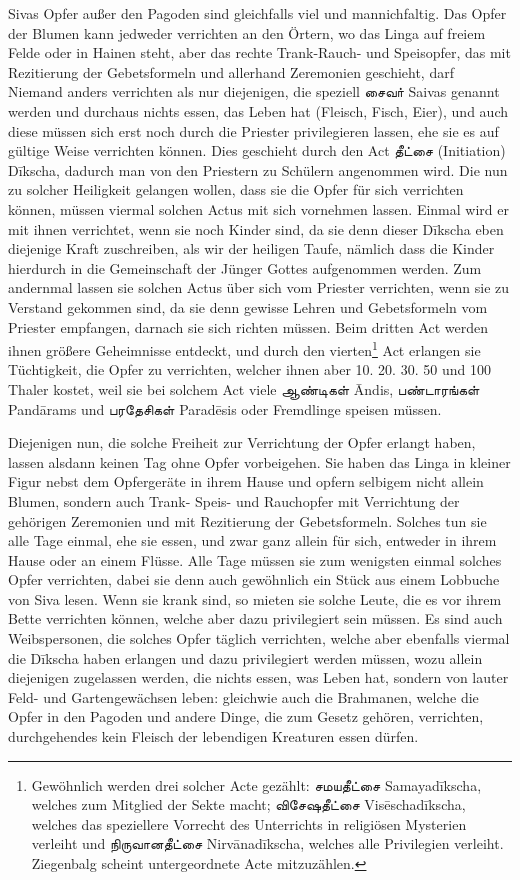 \documentclass{article}
\newcommand{\TamilText}[1]{\texttamil{#1}}
\newcommand{\tam}[1]{\TamilText{#1}}
\begin{document}
Sivas Opfer außer den Pagoden sind gleichfalls viel und mannichfaltig. Das Opfer der Blumen kann jedweder verrichten an den Örtern, wo das Linga auf freiem Felde oder in Hainen steht, aber das rechte Trank-Rauch- und Speisopfer, das mit Rezitierung der Gebetsformeln und allerhand Zeremonien geschieht, darf Niemand anders verrichten als nur diejenigen, die speziell \tam{சைவா்} Saivas genannt werden und durchaus nichts essen, das Leben hat (Fleisch, Fisch, Eier), und auch diese müssen sich erst noch durch die Priester privilegieren lassen, ehe sie es auf gültige Weise verrichten können. Dies geschieht durch den Act \tam{தீட்சை} (Initiation) D\={i}kscha, dadurch man von den Priestern zu Schülern angenommen wird. Die nun zu solcher Heiligkeit gelangen wollen, dass sie die Opfer für sich verrichten können, müssen viermal solchen Actus mit sich vornehmen lassen. Einmal wird er mit ihnen verrichtet, wenn sie noch Kinder sind, da sie denn dieser D\={i}kscha eben diejenige Kraft zuschreiben, als wir der heiligen Taufe, nämlich dass die Kinder hierdurch in die Gemeinschaft der Jünger Gottes aufgenommen werden. Zum andernmal lassen sie solchen Actus über sich vom Priester verrichten, wenn sie zu Verstand gekommen sind, da sie denn gewisse Lehren und Gebetsformeln vom Priester empfangen, darnach sie sich richten müssen. Beim dritten Act werden ihnen größere Geheimnisse entdeckt, und durch den vierten\footnote{Gewöhnlich werden drei solcher Acte gezählt: \tam{சமயதீட்சை} Samayad\={i}kscha, welches zum Mitglied der Sekte macht; \tam{விசேஷதீட்சை} Vis\={e}schad\={i}kscha, welches das speziellere Vorrecht des Unterrichts in religiösen Mysterien verleiht und \tam{நிருவானதீட்சை} Nirv\={a}nad\={i}kscha, welches alle Privilegien verleiht. Ziegenbalg scheint untergeordnete Acte mitzuzählen.} Act erlangen sie Tüchtigkeit, die Opfer zu verrichten, welcher ihnen aber 10. 20. 30. 50 und 100 Thaler kostet, weil sie bei solchem Act viele \tam{ஆண்டிகள்} \={A}ndis, \tam{பண்டாரங்கள்} Pand\={a}rams und \tam{பரதேசிகள்} Parad\={e}sis oder Fremdlinge speisen müssen.

Diejenigen nun, die solche Freiheit zur Verrichtung der Opfer erlangt haben, lassen alsdann keinen Tag ohne Opfer vorbeigehen. Sie haben das Linga in kleiner Figur nebst dem Opfergeräte in ihrem Hause und opfern selbigem nicht allein Blumen, sondern auch Trank- Speis- und Rauchopfer mit Verrichtung der gehörigen Zeremonien und mit Rezitierung der Gebetsformeln. Solches tun sie alle Tage einmal, ehe sie essen, und zwar ganz allein für sich, entweder in ihrem Hause oder an einem Flüsse. Alle Tage müssen sie zum wenigsten einmal solches Opfer verrichten, dabei sie denn auch gewöhnlich ein Stück aus einem Lobbuche von Siva lesen. Wenn sie krank sind, so mieten sie solche Leute, die es vor ihrem Bette verrichten können, welche aber dazu privilegiert sein müssen. Es sind auch Weibspersonen, die solches Opfer täglich verrichten, welche aber ebenfalls viermal die D\={i}kscha haben erlangen und dazu privilegiert werden müssen, wozu allein diejenigen zugelassen werden, die nichts essen, was Leben hat, sondern von lauter Feld- und Gartengewächsen leben: gleichwie auch die Brahmanen, welche die Opfer in den Pagoden und andere Dinge, die zum Gesetz gehören, verrichten, durchgehendes kein Fleisch der lebendigen Kreaturen essen dürfen.
\end{document}
